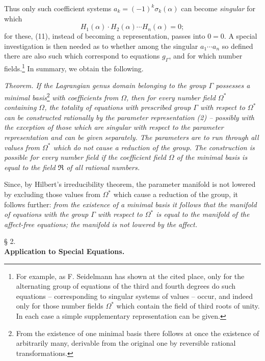 \documentclass[11pt]{article}
\begin{document}
Thus only such coefficient systems $a_k=(-1)^k\sigma_k(\alpha)$ can become \emph{singular} for which
\[
H_1(\alpha)\cdot H_2(\alpha)\cdots H_n(\alpha)=0;
\]
for these, (11), instead of becoming a representation, passes into $0=0$. A special investigation is then needed as to whether among the singular $a_1\cdots a_n$ so defined there are also such which correspond to equations $g_\Gamma$, and for which number fields.\footnote{For example, as F. Seidelmann has shown at the cited place, only for the alternating group of equations of the third and fourth degrees do such equations -- corresponding to singular systems of values -- occur, and indeed only for those number fields $\Omega^*$ which contain the field of third roots of unity. In each case a simple supplementary representation can be given.} In summary, we obtain the following.

\emph{Theorem. If the Lagrangian genus domain belonging to the group $\Gamma$ possesses a minimal basis}\footnote{From the existence of one minimal basis there follows at once the existence of arbitrarily many, derivable from the original one by reversible rational transformations.} \emph{with coefficients from $\Omega$, then for every number field $\Omega^*$ containing $\Omega$, the totality of equations with prescribed group $\Gamma$ with respect to $\Omega^*$ can be constructed rationally by the parameter representation (2) -- possibly with the exception of those which are singular with respect to the parameter representation and can be given separately. The parameters are to run through all values from $\Omega^*$ which do not cause a reduction of the group. The construction is possible for every number field if the coefficient field $\Omega$ of the minimal basis is equal to the field $\mathfrak R$ of all rational numbers.}

Since, by Hilbert's irreducibility theorem, the parameter manifold is not lowered by excluding those values from $\Omega^*$ which cause a reduction of the group, it follows further: \emph{from the existence of a minimal basis it follows that the manifold of equations with the group $\Gamma$ with respect to $\Omega^*$ is equal to the manifold of the affect-free equations; the manifold is not lowered by the affect.}

\begin{center}
§ 2.\\[0.75em]
\textbf{Application to Special Equations.}
\end{center}
\end{document}
